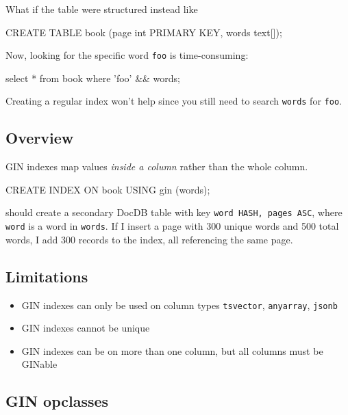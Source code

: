 \documentclass[11pt]{article}
\providecommand{\tightlist}{%
  \setlength{\itemsep}{0pt}\setlength{\parskip}{0pt}}
\begin{document}
What if the table were structured instead like

\begin{sqlcode}
CREATE TABLE book (page int PRIMARY KEY, words text[]);
\end{sqlcode}

Now, looking for the specific word \texttt{foo} is time-consuming:

\begin{sqlcode}
select * from book where '{foo}' && words;
\end{sqlcode}

Creating a regular index won't help since you still need to search
\texttt{words} for \texttt{foo}.

\hypertarget{overview}{%
\subsection{Overview}\label{overview}}

GIN indexes map values \emph{inside a column} rather than the whole
column.

\begin{sqlcode}
CREATE INDEX ON book USING gin (words);
\end{sqlcode}

should create a secondary DocDB table with key
\texttt{word\ HASH,\ pages\ ASC}, where \texttt{word} is a word in
\texttt{words}. If I insert a page with 300 unique words and 500 total
words, I add 300 records to the index, all referencing the same page.

\hypertarget{limitations}{%
\subsection{Limitations}\label{limitations}}

\begin{itemize}
\tightlist
\item
  GIN indexes can only be used on column types \texttt{tsvector},
  \texttt{anyarray}, \texttt{jsonb}
\item
  GIN indexes cannot be unique
\item
  GIN indexes can be on more than one column, but all columns must be
  GINable
\end{itemize}

\hypertarget{gin-opclasses}{%
\subsection{GIN opclasses}\label{gin-opclasses}}
\end{document}
